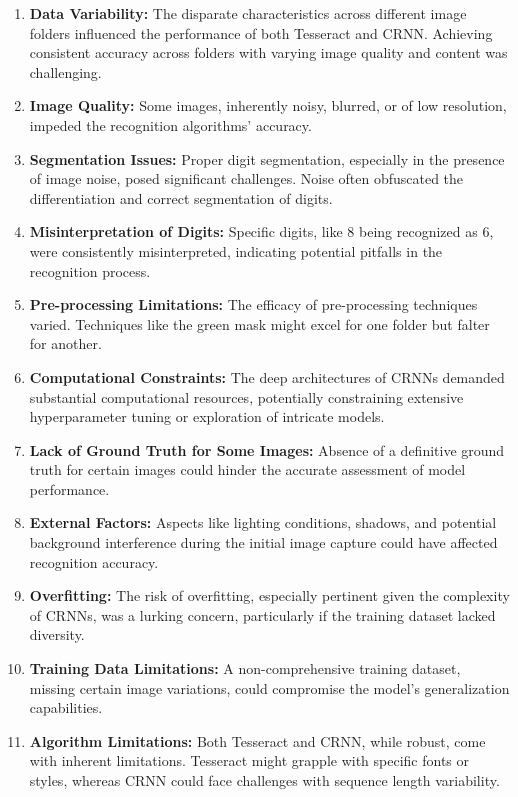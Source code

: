 \begin{enumerate}
    \item \textbf{Data Variability:} The disparate characteristics across different image folders influenced the performance of both Tesseract and CRNN. Achieving consistent accuracy across folders with varying image quality and content was challenging.

    \item \textbf{Image Quality:} Some images, inherently noisy, blurred, or of low resolution, impeded the recognition algorithms' accuracy.

    \item \textbf{Segmentation Issues:} Proper digit segmentation, especially in the presence of image noise, posed significant challenges. Noise often obfuscated the differentiation and correct segmentation of digits.

    \item \textbf{Misinterpretation of Digits:} Specific digits, like 8 being recognized as 6, were consistently misinterpreted, indicating potential pitfalls in the recognition process.

    \item \textbf{Pre-processing Limitations:} The efficacy of pre-processing techniques varied. Techniques like the green mask might excel for one folder but falter for another.

    \item \textbf{Computational Constraints:} The deep architectures of CRNNs demanded substantial computational resources, potentially constraining extensive hyperparameter tuning or exploration of intricate models.

    \item \textbf{Lack of Ground Truth for Some Images:} Absence of a definitive ground truth for certain images could hinder the accurate assessment of model performance.

    \item \textbf{External Factors:} Aspects like lighting conditions, shadows, and potential background interference during the initial image capture could have affected recognition accuracy.

    \item \textbf{Overfitting:} The risk of overfitting, especially pertinent given the complexity of CRNNs, was a lurking concern, particularly if the training dataset lacked diversity.

    \item \textbf{Training Data Limitations:} A non-comprehensive training dataset, missing certain image variations, could compromise the model's generalization capabilities.

    \item \textbf{Algorithm Limitations:} Both Tesseract and CRNN, while robust, come with inherent limitations. Tesseract might grapple with specific fonts or styles, whereas CRNN could face challenges with sequence length variability.
\end{enumerate}



